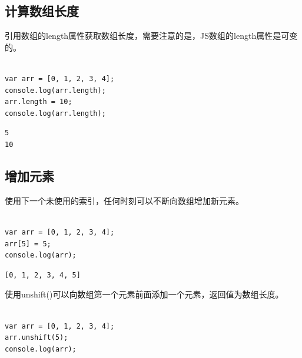 \subsection{计算数组长度}

引用数组的length属性获取数组长度，需要注意的是，JS数组的length属性是可变的。\\

\\

\begin{lstlisting}[style=htmlcssjs]
var arr = [0, 1, 2, 3, 4];
console.log(arr.length);
arr.length = 10;
console.log(arr.length);
\end{lstlisting}

\begin{tcolorbox}
	\begin{verbatim}
5
10
	\end{verbatim}
\end{tcolorbox}

\vspace{0.5cm}

\subsection{增加元素}

使用下一个未使用的索引，任何时刻可以不断向数组增加新元素。\\

\\

\begin{lstlisting}[style=htmlcssjs]
var arr = [0, 1, 2, 3, 4];
arr[5] = 5;
console.log(arr);
\end{lstlisting}

\begin{tcolorbox}
	\begin{verbatim}
[0, 1, 2, 3, 4, 5]
	\end{verbatim}
\end{tcolorbox}

使用unshift()可以向数组第一个元素前面添加一个元素，返回值为数组长度。\\

\\

\begin{lstlisting}[style=htmlcssjs]
var arr = [0, 1, 2, 3, 4];
arr.unshift(5);
console.log(arr);
\end{lstlisting}

